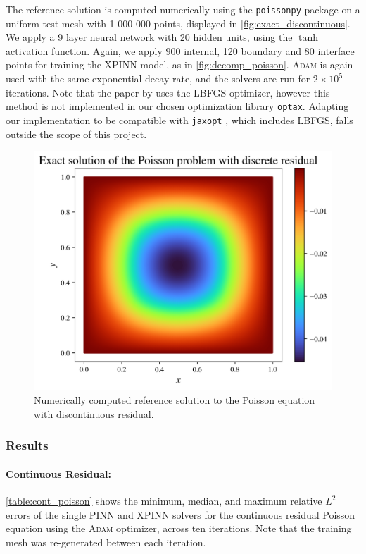 The reference solution is computed numerically using the \verb|poissonpy| package \cite{poissonpy} on a uniform test mesh with 1 000 000 points, displayed in \autoref{fig:exact_discontinuous}.
We apply a 9 layer neural network with 20 hidden units, using the $\tanh$ activation function.
Again, we apply 900 internal, 120 boundary and 80 interface points for training the XPINN model, as in \autoref{fig:decomp_poisson}.
\textsc{Adam} is again used with the same exponential decay rate, and the solvers are run for $2\times 10^5$ iterations.
Note that the paper by \textcite{XPINN_generalize} uses the LBFGS optimizer, however this method is not implemented in our chosen optimization library \verb|optax|. 
Adapting our implementation to be compatible with \verb|jaxopt| \cite{jaxopt_implicit_diff}, which includes LBFGS, falls outside the scope of this project.

\begin{figure}[!h]
    \centering
    \includegraphics[width = 0.8\linewidth]{Project1XPINNs/figures/Poisson/discrete_Poisson_solution.png}
    \caption{Numerically computed reference solution to the Poisson equation with discontinuous residual.}
    \label{fig:exact_discontinuous}
\end{figure}

\subsubsection{Results}
\paragraph{Continuous Residual:}
\autoref{table:cont_poisson} shows the minimum, median, and maximum relative $L^2$ errors of the single PINN and XPINN solvers for the continuous residual Poisson equation using the \textsc{Adam} optimizer, across ten iterations.
Note that the training mesh was re-generated between each iteration.

